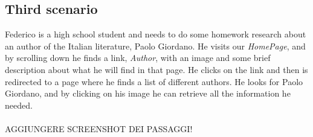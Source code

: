 \documentclass[12pt,a4paper]{article}
\begin{document}
\subsection{Third scenario}
Federico is a high school student and needs to do some homework research about an author of the Italian literature, Paolo Giordano. He visits our \textit{HomePage}, and by scrolling down he finds a link, \textit{Author}, with an image and some brief description about what he will find in that page. He clicks on the link and then is redirected to a page where he finds a list of different authors. He looks for Paolo Giordano, and by clicking on his image he can retrieve all the information he needed.\\\\
AGGIUNGERE SCREENSHOT DEI PASSAGGI!
\end{document}
